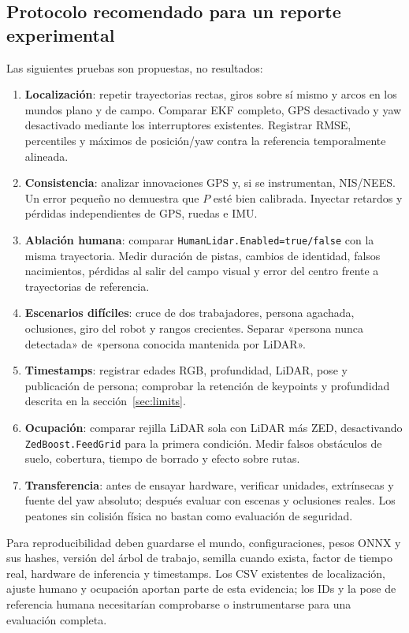 \documentclass[11pt,a4paper]{article}
\newcommand{\code}[1]{\nolinkurl{#1}}
\begin{document}
\subsection{Protocolo recomendado para un reporte experimental}
Las siguientes pruebas son propuestas, no resultados:
\begin{enumerate}
\item \textbf{Localización}: repetir trayectorias rectas, giros sobre sí mismo y
arcos en los mundos plano y de campo. Comparar EKF completo, GPS desactivado y yaw
desactivado mediante los interruptores existentes. Registrar RMSE, percentiles y
máximos de posición/yaw contra la referencia temporalmente alineada.
\item \textbf{Consistencia}: analizar innovaciones GPS y, si se instrumentan,
NIS/NEES. Un error pequeño no demuestra que $P$ esté bien calibrada. Inyectar
retardos y pérdidas independientes de GPS, ruedas e IMU.
\item \textbf{Ablación humana}: comparar \code{HumanLidar.Enabled=true/false} con
la misma trayectoria. Medir duración de pistas, cambios de identidad, falsos
nacimientos, pérdidas al salir del campo visual y error del centro frente a
trayectorias de referencia.
\item \textbf{Escenarios difíciles}: cruce de dos trabajadores, persona agachada,
oclusiones, giro del robot y rangos crecientes. Separar «persona nunca detectada»
de «persona conocida mantenida por LiDAR».
\item \textbf{Timestamps}: registrar edades RGB, profundidad, LiDAR, pose y
publicación de persona; comprobar la retención de keypoints y profundidad descrita
en la sección~\ref{sec:limits}.
\item \textbf{Ocupación}: comparar rejilla LiDAR sola con LiDAR más ZED,
desactivando \code{ZedBoost.FeedGrid} para la primera condición. Medir falsos
obstáculos de suelo, cobertura, tiempo de borrado y efecto sobre rutas.
\item \textbf{Transferencia}: antes de ensayar hardware, verificar unidades,
extrínsecas y fuente del yaw absoluto; después evaluar con escenas y oclusiones
reales. Los peatones sin colisión física no bastan como evaluación de seguridad.
\end{enumerate}

Para reproducibilidad deben guardarse el mundo, configuraciones, pesos ONNX y sus
hashes, versión del árbol de trabajo, semilla cuando exista, factor de tiempo real,
hardware de inferencia y timestamps. Los CSV existentes de localización, ajuste
humano y ocupación aportan parte de esta evidencia; los IDs y la pose de referencia
humana necesitarían comprobarse o instrumentarse para una evaluación completa.
\cite{openworker,humanworker,resworker}
\end{document}
